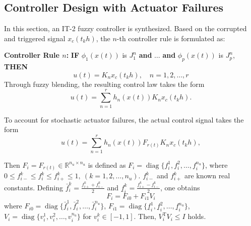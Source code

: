 \documentclass[preprint,review,fleqn,sort&compress,3p]{elsarticle}
\theoremstyle{definition} %
\theoremstyle{definition}%
\newif\ifreviewmarkup
\DeclareRobustCommand{\revdel}[1]{\ifreviewmarkup{\color{revisionred}\hypersetup{linkcolor=revisionred,citecolor=revisionred}#1}\fi}
\DeclareRobustCommand{\revadd}[1]{{\ifreviewmarkup\color{revisiongreen}\hypersetup{linkcolor=revisiongreen,citecolor=revisiongreen}\fi#1}}
\begin{document}
\subsection{Controller Design with Actuator Failures}
In this section, an IT-2 fuzzy controller is synthesized. Based on the corrupted and triggered signal $x_c(t_k h)$, the $n$-th controller rule is formulated as:

\textbf{Controller Rule $n$:} 
\textbf{IF} $\phi_1(x(t))$ is $J^{n}_1$ \textbf{and} $\dots$ \textbf{and} $\phi_p(x(t))$ is $J^{n}_p$, \textbf{THEN}
\begin{equation} 
	u(t) = K_{n} x_c(t_{k} h), \quad n = 1, 2, \ldots, r
\end{equation}
\label{rev:M21}\revdel{where $K_n$ denote the controller gains to be designed.} Through fuzzy blending, the resulting control law takes the form
\begin{equation} 
	u(t) = \sum_{n=1}^{r} h_n(x(t)) K_{n} x_c(t_k h).
\end{equation}

To account for stochastic actuator failures, the actual control signal takes the form
\begin{equation}\label{eq:local_controller}
	u(t) = \sum_{n=1}^{r} h_n(x(t)) F_{r(t)} K_{n} x_c(t_k h),
\end{equation}

\label{rev:M22}\revdel{For notational convenience, let $i = r(t)$.} 
Then $F_i = F_{r(t)} \in \mathbb{R}^{n_u \times n_u}$ is defined as $F_i = \operatorname{diag}\{f_{i}^1, f_{i}^2, \ldots, f_{i}^{n_u}\}$, where $0 \le f_{i-}^{k} \le f_{i}^{k} \le f_{i+}^{k} \le 1,\ (k = 1,2,\ldots,n_u)$. $f_{i-}^{k}$ and $f_{i+}^{k}$ are known real constants. 
Defining $\bar{f}_{i}^{k} = \frac{f_{i+}^{k} + f_{i-}^{k}}{2}$ and $\underline{f}_{i}^{k} = \frac{f_{i+}^{k} - f_{i-}^{k}}{2}$, one obtains
\begin{equation}\label{F_i01}
	F_{i}= F_{i0}+F_{i1} V_{i}
\end{equation}
where $F_{i0} = \operatorname{diag}\{\bar{f}_{i}^{1}, \bar{f}_{i}^{2}, \ldots, \bar{f}_{i}^{n_u}\}$, $F_{i1} = \operatorname{diag}\{\underline{f}_{i}^{1}, \underline{f}_{i}^{2}, \ldots, \underline{f}_{i}^{n_u}\}$, $V_i = \operatorname{diag}\{v_{i}^{1}, v_{i}^{2}, \ldots, v_{i}^{n_u}\}$ for $v_i^k \in [-1,1]$. Then, $V_i^\mathrm{T}V_i \le I$ holds.
\end{document}
